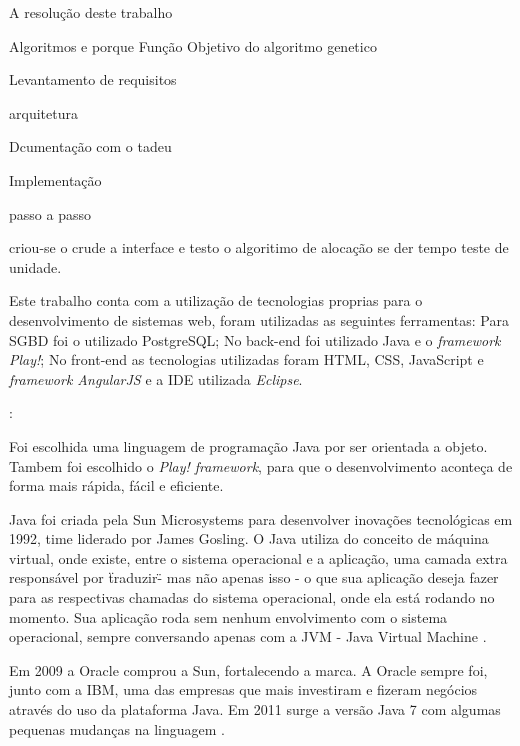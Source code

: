 \documentclass{abntpuc}
\begin{document}
%


%


A resolução deste trabalho

Algoritmos e porque
Função Objetivo do algoritmo genetico

Levantamento de requisitos

arquitetura

Dcumentação com o tadeu

Implementação

passo a passo

criou-se o crude a interface e testo o algoritimo de alocação se der tempo teste de unidade.




	Este trabalho conta com a utilização de tecnologias proprias para o desenvolvimento de sistemas web, foram utilizadas as seguintes ferramentas: Para SGBD foi o utilizado PostgreSQL; No back-end foi utilizado Java e o \textit{framework Play!}; No front-end as tecnologias utilizadas foram HTML, CSS, JavaScript e \textit{framework AngularJS} e a IDE utilizada \textit{Eclipse}.


	\textit{}:\cite{alterar}



	Foi escolhida uma linguagem de programação Java por ser orientada a objeto. Tambem foi escolhido o \textit{Play! framework}, para que o desenvolvimento aconteça de forma mais rápida, fácil e eficiente.\par

	Java foi criada pela Sun Microsystems para desenvolver inovações tecnológicas em 1992, time liderado por James Gosling. O Java utiliza do conceito de máquina virtual, onde existe, entre o sistema operacional e a aplicação, uma camada extra responsável por \"traduzir\" - mas não apenas isso - o que sua aplicação deseja fazer para as respectivas chamadas do sistema operacional, onde ela está rodando no momento. Sua aplicação roda sem nenhum envolvimento com o sistema operacional, sempre conversando apenas com a JVM - Java Virtual Machine \cite{caelum}.\par

	Em 2009 a Oracle comprou a Sun, fortalecendo a marca. A Oracle sempre foi, junto com a IBM, uma das empresas que mais investiram e fizeram negócios através do uso da plataforma Java. Em 2011 surge a versão Java 7 com algumas pequenas mudanças na linguagem \cite{caelum}.\par
\end{document}
